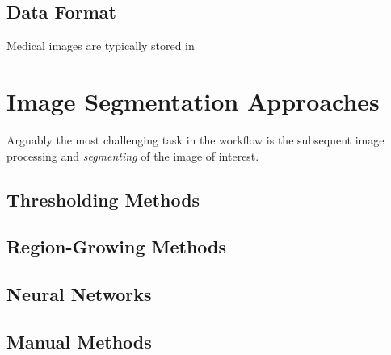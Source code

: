 \subsection{Data Format}
\label{Data Format}
Medical images are typically stored in 

\section{Image Segmentation Approaches}
\label{Image Segmentation Approaches}

Arguably the most challenging task in the workflow is the subsequent image processing and \textit{segmenting} of the image of interest.

\subsection{Thresholding Methods}
\label{Thresholding Methods}

\subsection{Region-Growing Methods}
\label{Region-Growing Methods}

\subsection{Neural Networks}
\label{Neural Networks}

\subsection{Manual Methods}
\label{Manual Methods}

